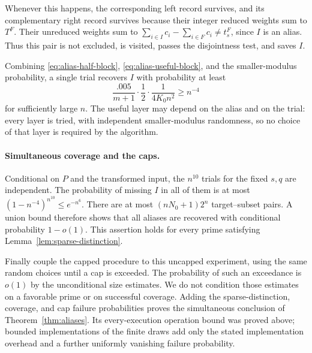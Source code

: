 Whenever this happens, the corresponding left record survives, and its
complementary right record survives because their integer reduced weights
sum to $T^F$.  Their unreduced weights sum to
$\sum_{i\in I}c_i-\sum_{i\in F}c_i\ne t_s^F$, since $I$ is an alias.
Thus this pair is not excluded, is visited, passes the disjointness test,
and saves $I$.

Combining \eqref{eq:alias-half-block},
\eqref{eq:alias-useful-block}, and the smaller-modulus probability, a
single trial recovers $I$ with probability at least
\[
 \frac{.005}{m+1}\cdot\frac12\cdot\frac1{4K_0n^2}
 \ge n^{-4}
\]
for sufficiently large $n$.  The useful layer may depend on the alias
and on the trial: every layer is tried, with independent smaller-modulus
randomness, so no choice of that layer is required by the algorithm.

\paragraph{Simultaneous coverage and the caps.}
Conditional on $P$ and the transformed input, the $n^{10}$ trials for
the fixed $s,q$ are independent.  The probability of missing $I$ in all
of them is at most
$(1-n^{-4})^{n^{10}}\le e^{-n^6}$.
There are at most $(nN_0+1)2^n$ target--subset pairs.  A union bound
therefore shows that all aliases are recovered with conditional
probability $1-o(1)$.  This assertion holds for every prime satisfying
Lemma~\ref{lem:sparse-distinction}.

Finally couple the capped procedure to this uncapped experiment, using
the same random choices until a cap is exceeded.  The probability of
such an exceedance is $o(1)$ by the unconditional size estimates.  We do
not condition those estimates on a favorable prime or on successful
coverage.  Adding the sparse-distinction, coverage, and cap failure
probabilities proves the simultaneous conclusion of
Theorem~\ref{thm:aliases}.  Its every-execution operation bound was proved
above; bounded implementations of the finite draws add only the stated
implementation overhead and a further uniformly vanishing failure
probability.
